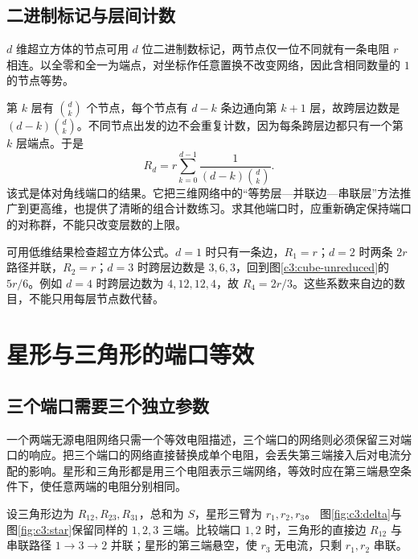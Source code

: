 \subsection{二进制标记与层间计数}

$d$ 维超立方体的节点可用 $d$ 位二进制数标记，两节点仅一位不同就有一条电阻 $r$ 相连。以全零和全一为端点，对坐标作任意置换不改变网络，因此含相同数量的 $1$ 的节点等势。

第 $k$ 层有 $\binom dk$ 个节点，每个节点有 $d-k$ 条边通向第 $k+1$ 层，故跨层边数是 $(d-k)\binom dk$。不同节点出发的边不会重复计数，因为每条跨层边都只有一个第 $k$ 层端点。于是
\[
 R_d=r\sum_{k=0}^{d-1}\frac1{(d-k)\binom dk}.
\]
该式是体对角线端口的结果。它把三维网络中的“等势层—并联边—串联层”方法推广到更高维，也提供了清晰的组合计数练习。求其他端口时，应重新确定保持端口的对称群，不能只改变层数的上限。


可用低维结果检查超立方体公式。$d=1$ 时只有一条边，$R_1=r$；$d=2$ 时两条 $2r$ 路径并联，$R_2=r$；$d=3$ 时跨层边数是 $3,6,3$，回到图\ref{c3:cube-unreduced}的 $5r/6$。例如 $d=4$ 时跨层边数为 $4,12,12,4$，故 $R_4=2r/3$。这些系数来自边的数目，不能只用每层节点数代替。

\section{星形与三角形的端口等效}
\subsection{三个端口需要三个独立参数}

一个两端无源电阻网络只需一个等效电阻描述，三个端口的网络则必须保留三对端口的响应。把三个端口的网络直接替换成单个电阻，会丢失第三端接入后对电流分配的影响。星形和三角形都是用三个电阻表示三端网络，等效时应在第三端悬空条件下，使任意两端的电阻分别相同。


设三角形边为 $R_{12},R_{23},R_{31}$，总和为 $S$，星形三臂为 $r_1,r_2,r_3$。
图\ref{fig:c3:delta}与图\ref{fig:c3:star}保留同样的 $1,2,3$ 三端。比较端口 $1,2$ 时，三角形的直接边 $R_{12}$ 与串联路径 $1\to3\to2$ 并联；星形的第三端悬空，使 $r_3$ 无电流，只剩 $r_1,r_2$ 串联。


